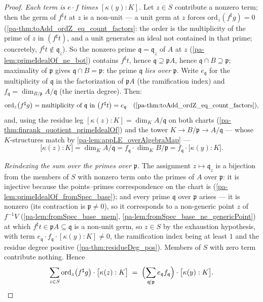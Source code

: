 \begin{proof}
  \emph{Each term is \(e \cdot f\) times \([\kappa(y):K]\).} Let \(z \in S\) contribute
  a nonzero term; then the germ of \(f^{\sharp}t\) at \(z\) is a non-unit --- a unit
  germ at \(z\) forces \(\mathrm{ord}_z(f^{\sharp}g) = 0\)
  (\ref{pa-thm:toAdd_ordZ_eq_count_factors}: the order is the multiplicity of the prime of
  \(z\) in \((f^{\sharp}t)\), and a unit generates an ideal not contained in that
  prime; concretely, \(f^{\sharp}t \notin \mathfrak q_z\)). So the nonzero prime
  \(\mathfrak q = \mathfrak q_z\) of \(A\) at \(z\) (\ref{pa-lem:primeIdealOf_ne_bot})
  contains \(f^{\sharp}t\), hence \(\mathfrak q \supseteq \mathfrak p A\), hence
  \(\mathfrak q \cap B \supseteq \mathfrak p\); maximality of \(\mathfrak p\) gives
  \(\mathfrak q \cap B = \mathfrak p\): the prime \(\mathfrak q\) \emph{lies over}
  \(\mathfrak p\). Write \(e_{\mathfrak q}\) for the multiplicity of \(\mathfrak q\) in
  the factorization of \(\mathfrak p A\) (the ramification index) and
  \(f_{\mathfrak q} = \dim_{B/\mathfrak p} A/\mathfrak q\) (the inertia degree). Then:
  \[
    \mathrm{ord}_z\bigl(f^{\sharp}g\bigr)
      = \text{multiplicity of } \mathfrak q \text{ in } \bigl(f^{\sharp}t\bigr)
      = e_{\mathfrak q}
    \quad (\ref{pa-thm:toAdd_ordZ_eq_count_factors}),
  \]
  and, using the residue leg \([\kappa(z) : K] = \dim_K A/\mathfrak q\) on both charts
  (\ref{pa-thm:finrank_quotient_primeIdealOf}) and the tower
  \(K \to B/\mathfrak p \to A/\mathfrak q\) --- whose \(K\)-structures match by
  \ref{pa-lem:appLE_overAlgebraMap} ---
  \[
    \bigl[\kappa(z) : K\bigr] = \dim_K A/\mathfrak q
      = f_{\mathfrak q} \cdot \dim_K B/\mathfrak p
      = f_{\mathfrak q} \cdot \bigl[\kappa(y) : K\bigr].
  \]

  \emph{Reindexing the sum over the primes over \(\mathfrak p\).} The assignment
  \(z \mapsto \mathfrak q_z\) is a bijection from the members of \(S\) with nonzero
  term onto the primes of \(A\) over \(\mathfrak p\): it is injective because the
  points--primes correspondence on the chart is
  (\ref{pa-lem:primeIdealOf_fromSpec_base}); and every prime \(\mathfrak q\) over
  \(\mathfrak p\) arises --- it is nonzero (its contraction is \(\mathfrak p \neq 0\)),
  so it corresponds to a non-generic point \(z\) of \(f^{-1}V\)
  (\ref{pa-lem:fromSpec_base_mem}, \ref{pa-lem:fromSpec_base_ne_genericPoint}) at which
  \(f^{\sharp}t \in \mathfrak p A \subseteq \mathfrak q\) is a non-unit germ, so
  \(z \in S\) by the exhaustion hypothesis, with term
  \(e_{\mathfrak q} \cdot f_{\mathfrak q} \cdot [\kappa(y):K] \neq 0\), the
  ramification index being at least \(1\) and the residue degree positive
  (\ref{pa-thm:residueDeg_pos}). Members of \(S\) with zero term contribute nothing.
  Hence
  \[
    \sum_{z \in S} \mathrm{ord}_z\bigl(f^{\sharp}g\bigr) \cdot
      \bigl[\kappa(z) : K\bigr]
    \;=\; \Bigl(\sum_{\mathfrak q \mid \mathfrak p}
      e_{\mathfrak q} f_{\mathfrak q}\Bigr) \cdot \bigl[\kappa(y) : K\bigr].
  \]


\end{proof}
